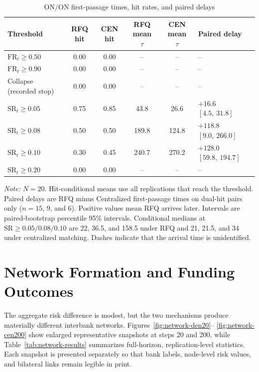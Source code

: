 \begin{table}[htbp]
\centering
\caption{ON/ON first-passage times, hit rates, and paired delays}
\label{tab:first-passage}
\small
\setlength{\tabcolsep}{4pt}
\begin{tabularx}{\textwidth}{@{}lcccc>{\centering\arraybackslash}X@{}}
\toprule
\textbf{Threshold} & \textbf{RFQ hit} & \textbf{CEN hit} & \shortstack{\textbf{RFQ mean}\\\(\tau\)} & \shortstack{\textbf{CEN mean}\\\(\tau\)} & \textbf{Paired delay}\\
\midrule
$\mathrm{FR}_t\geq 0.50$ & 0.00 & 0.00 & -- & -- & --\\
$\mathrm{FR}_t\geq 0.90$ & 0.00 & 0.00 & -- & -- & --\\
Collapse (recorded stop) & 0.00 & 0.00 & -- & -- & --\\
$\mathrm{SR}_t\geq 0.05$ & 0.75 & 0.85 & 43.8 & 26.6 & $+16.6$ $[4.5,\ 31.8]$\\
$\mathrm{SR}_t\geq 0.08$ & 0.50 & 0.50 & 189.8 & 124.8 & $+118.8$ $[9.0,\ 266.0]$\\
$\mathrm{SR}_t\geq 0.10$ & 0.30 & 0.45 & 240.7 & 270.2 & $+128.0$ $[59.8,\ 194.7]$\\
$\mathrm{SR}_t\geq 0.20$ & 0.00 & 0.00 & -- & -- & --\\
\bottomrule
\end{tabularx}
\begin{minipage}{0.96\textwidth}
\footnotesize
\textit{Note:} \(N=20\). Hit-conditional means use all replications that
reach the threshold. Paired delays are RFQ minus Centralized first-passage
times on dual-hit pairs only (\(n=15\), \(9\), and \(6\)). Positive values
mean RFQ arrives later. Intervals are paired-bootstrap percentile 95\%
intervals. Conditional medians at \(\mathrm{SR}\ge 0.05/0.08/0.10\) are
22, 36.5, and 158.5 under RFQ and 21, 21.5, and 34 under centralized
matching. Dashes indicate that the arrival time is unidentified.
\end{minipage}
\end{table}

\section{Network Formation and Funding Outcomes}

The aggregate risk difference is modest, but the two mechanisms produce
materially different interbank networks. Figures~\ref{fig:network-den20}--
\ref{fig:network-cen200} show enlarged representative snapshots at steps
20 and 200, while Table~\ref{tab:network-results} summarizes full-horizon,
replication-level statistics. Each snapshot is presented separately so
that bank labels, node-level risk values, and bilateral links remain
legible in print.

